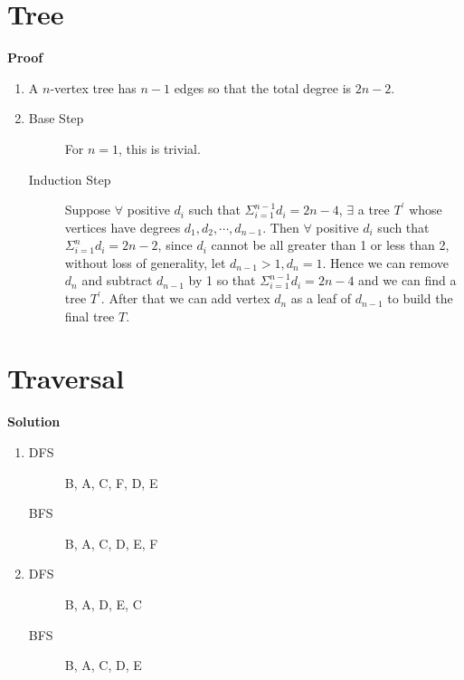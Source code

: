 \documentclass{../../cls/sig-alternate-05-2015}
\begin{document}
\section{Tree}
\textbf{Proof}\begin{enumerate}[label=(\alph*)]
	\item A $n$-vertex tree has $n-1$ edges so that the total degree is $2n - 2$.
	\item \begin{description}
		\item[Base Step] For $n = 1$, this is trivial.
		\item[Induction Step] Suppose $\forall$ positive $d_i$ such that $\Sigma_{i = 1}^{n - 1} d_i = 2n - 4$, $\exists$ a tree $T^\prime$ whose vertices have degrees $d_1, d_2, \cdots, d_{n - 1}$. Then $\forall$ positive $d_i$ such that $\Sigma_{i = 1}^{n} d_i = 2n - 2$, since $d_i$ cannot be all greater than 1 or less than 2, without loss of generality, let $d_{n - 1} > 1, d_n = 1$. Hence we can remove $d_n$ and subtract $d_{n - 1}$ by 1 so that $\Sigma_{i = 1}^{n - 1} d_i = 2n - 4$ and we can find a tree $T^\prime$. After that we can add vertex $d_n$ as a leaf of $d_{n - 1}$ to build the final tree $T$.
	\end{description}
\end{enumerate}

\section{Traversal}
\textbf{Solution}\begin{enumerate}[label=(\alph*)]
	\item \begin{description}
		\item[DFS] B, A, C, F, D, E
		\item[BFS] B, A, C, D, E, F
	\end{description}
	\item \begin{description}
		\item[DFS] B, A, D, E, C
		\item[BFS] B, A, C, D, E
	\end{description}
\end{enumerate}
\end{document}

